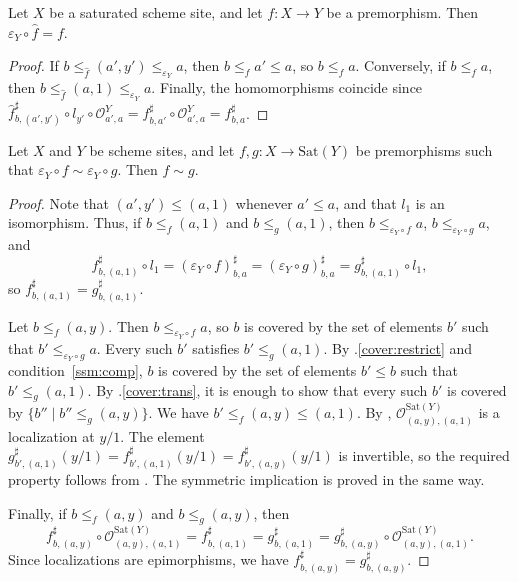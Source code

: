 \documentclass[reqno]{amsart}
\theoremstyle{definition}
\theoremstyle{remark}
\numberwithin{figure}{section}
\begin{document}
\begin{lem}
Let $X$ be a saturated scheme site, and let $f : X \to Y$ be a premorphism.
Then $\varepsilon_Y \circ \widehat{f} = f$.
\end{lem}
\begin{proof}
If $b \leq_{\widehat{f}} (a',y') \leq_{\varepsilon_Y} a$, then $b \leq_f a' \leq a$, so $b \leq_f a$.
Conversely, if $b \leq_f a$, then $b \leq_{\widehat{f}} (a,1) \leq_{\varepsilon_Y} a$.
Finally, the homomorphisms coincide since $\widehat{f}^\sharp_{b,(a',y')} \circ l_{y'} \circ \mathcal{O}^Y_{a',a} = f^\sharp_{b,a'} \circ \mathcal{O}^Y_{a',a} = f^\sharp_{b,a}$.
\end{proof}

\begin{lem}
Let $X$ and $Y$ be scheme sites, and let $f,g : X \to \mathrm{Sat}(Y)$ be premorphisms such that $\varepsilon_Y \circ f \sim \varepsilon_Y \circ g$.
Then $f \sim g$.
\end{lem}
\begin{proof}
Note that $(a',y') \leq (a,1)$ whenever $a' \leq a$, and that $l_1$ is an isomorphism.
Thus, if $b \leq_f (a,1)$ and $b \leq_g (a,1)$, then $b \leq_{\varepsilon_Y \circ f} a$, $b \leq_{\varepsilon_Y \circ g} a$, and
\[ f^\sharp_{b,(a,1)} \circ l_1 = (\varepsilon_Y \circ f)^\sharp_{b,a} = (\varepsilon_Y \circ g)^\sharp_{b,a} = g^\sharp_{b,(a,1)} \circ l_1, \]
so $f^\sharp_{b,(a,1)} = g^\sharp_{b,(a,1)}$.

Let $b \leq_f (a,y)$.
Then $b \leq_{\varepsilon_Y \circ f} a$, so $b$ is covered by the set of elements $b'$ such that $b' \leq_{\varepsilon_Y \circ g} a$.
Every such $b'$ satisfies $b' \leq_g (a,1)$.
By .\eqref{cover:restrict} and condition~\eqref{ssm:comp}, $b$ is covered by the set of elements $b' \leq b$ such that $b' \leq_g (a,1)$.
By .\eqref{cover:trans}, it is enough to show that every such $b'$ is covered by $\{ b'' \mid b'' \leq_g (a,y) \}$.
We have $b' \leq_f (a,y) \leq (a,1)$.
By , $\mathcal{O}^{\mathrm{Sat}(Y)}_{(a,y),(a,1)}$ is a localization at $y/1$.
The element $g^\sharp_{b',(a,1)}(y/1) = f^\sharp_{b',(a,1)}(y/1) = f^\sharp_{b',(a,y)}(y/1)$ is invertible, so the required property follows from .
The symmetric implication is proved in the same way.

Finally, if $b \leq_f (a,y)$ and $b \leq_g (a,y)$, then
\[ f^\sharp_{b,(a,y)} \circ \mathcal{O}^{\mathrm{Sat}(Y)}_{(a,y),(a,1)} = f^\sharp_{b,(a,1)} = g^\sharp_{b,(a,1)} = g^\sharp_{b,(a,y)} \circ \mathcal{O}^{\mathrm{Sat}(Y)}_{(a,y),(a,1)}. \]
Since localizations are epimorphisms, we have $f^\sharp_{b,(a,y)} = g^\sharp_{b,(a,y)}$.
\end{proof}
\end{document}
